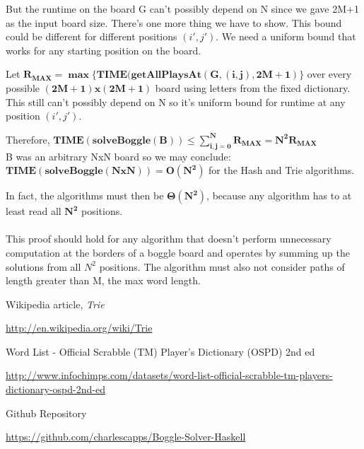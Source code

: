 \documentclass{article}
\newcommand{\tab}{\hspace*{2em}}
\begin{document}
But the runtime on the board G can't possibly depend on N since we gave 2M+1 as the input board size. There's one more thing we have to show. This bound could be different for different positions $(i', j')$. We need a uniform bound that works for any starting position on the board.  

Let $\mathbf{R_{MAX} = \max \{TIME(getAllPlaysAt(G, (i,j), 2M+1)} \}$ over every possible $\mathbf{(2M+1)x(2M+1)}$ board using letters from the fixed dictionary. This still can't possibly depend on N so it's uniform bound for runtime at any position $(i', j')$. 

Therefore, $\mathbf{TIME(solveBoggle(B)) \leq \sum_{i,j = 0}^N R_{MAX} = N^2 R_{MAX}}$\\
B was an arbitrary NxN board so we may conclude: \\
\tab \tab \tab $ \mathbf{TIME(solveBoggle(NxN)) = O(N^2)}$ for the Hash and Trie algorithms.

In fact, the algorithms must then be $\mathbf{\Theta(N^2)}$, because any algorithm has to at least read all $\mathbf{N^2}$ positions.
\\
\\
This proof should hold for any algorithm that doesn't perform unnecessary computation at the borders of a boggle board and operates by summing up the solutions from all $N^2$ positions. The algorithm must also not consider paths of length greater than M, the max word length.

\begin{thebibliography}{9}
Wikipedia article, \emph{Trie}

\url{http://en.wikipedia.org/wiki/Trie}

Word List - Official Scrabble (TM) Player's Dictionary (OSPD) 2nd ed

\url{http://www.infochimps.com/datasets/word-list-official-scrabble-tm-players-dictionary-ospd-2nd-ed}

Github Repository

\url{https://github.com/charlescapps/Boggle-Solver-Haskell}

\end{thebibliography}
   
\end{document}
